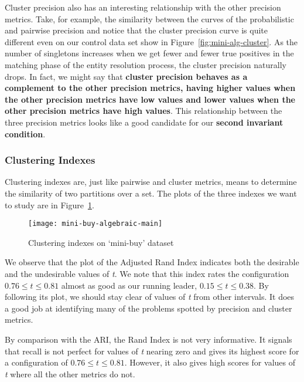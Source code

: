 Cluster precision also has an interesting relationship with the other precision
metrics.
Take, for example, the similarity between the curves of the probabilistic and
pairwise precision and notice that the cluster precision curve is quite
different even on our control data set show in Figure~\ref{fig:mini-alg-cluster}.
As the number of singletons increases when we get fewer and fewer true positives
in the matching phase of the entity resolution process, the cluster precision
naturally drops.
In fact, we might say that \textbf{cluster precision behaves as a complement to the
other precision metrics, having higher values when the other precision metrics
have low values and lower values when the other precision metrics have high
values}.
This relationship between the three precision metrics looks like a good
candidate for our \textbf{second invariant condition}.

\subsubsection{Clustering Indexes}\label{subsubsec:Clustering Indexes}

Clustering indexes are, just like pairwise and cluster metrics, means to
determine the similarity of two partitions over a set.
The plots of the three indexes we want to study are in Figure~\ref{fig:mini-alg}.

\begin{figure}[htbp]
    \centering
    \captionsetup{justification=centering}
    \texttt{[image: mini-buy-algebraic-main]}
    \caption{Clustering indexes on `mini-buy' dataset}
    \label{fig:mini-alg}
\end{figure}

We observe that the plot of the Adjusted Rand Index indicates both the desirable
and the undesirable values of \textit{t}.
We note that this index rates the configuration $0.76 \le t \le 0.81$ almost as
good as our running leader, $0.15 \le t \le 0.38$.
By following its plot, we should stay clear of values of \textit{t} from other
intervals.
It does a good job at identifying many of the problems spotted by precision and
cluster metrics.

By comparison with the ARI, the Rand Index is not very informative.
It signals that recall is not perfect for values of \textit{t} nearing zero and
gives its highest score for a configuration of $0.76 \le t \le 0.81$.
However, it also gives high scores for values of \textit{t} where all the other
metrics do not.

